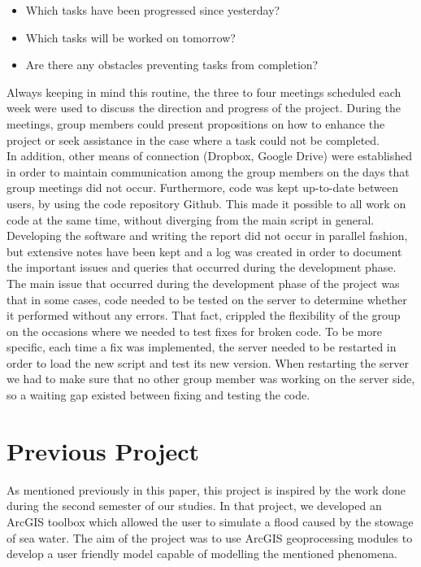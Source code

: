 \begin{itemize}
\item Which tasks have been progressed since yesterday?
\item Which tasks will be worked on tomorrow?
\item Are there any obstacles preventing tasks from completion?
\end{itemize}

Always keeping in mind this routine, the three to four meetings scheduled each week were used to discuss the direction and progress of the project. 
During the meetings, group members could present propositions on how to enhance the project or seek assistance in the case where a task could not be completed. \\
In addition, other means of connection (Dropbox, Google Drive) were established in order to maintain communication among the group members on the days that group meetings did not occur. Furthermore, code was kept up-to-date between users, by using the code repository Github. This made it possible to all work on code at the same time, without diverging from the main script in general. \\
Developing the software and writing the report did not occur in parallel fashion, but extensive notes have been kept and a log was created in order to document the important issues and queries that occurred during the development phase. \\

The main issue that occurred during the development phase of the project was that in some cases, code needed to be tested on the server to determine whether it performed without any errors. That fact, crippled the flexibility of the group on the occasions where we needed to test fixes for broken code. To be more specific, each time a fix was implemented, the server needed to be restarted in order to load the new script and test its new version. When restarting the server we had to make sure that no other group member was working on the server side, so a waiting gap existed between fixing and testing the code.\\

\section{Previous Project}
As mentioned previously in this paper, this project is inspired by the work done during the second semester of our studies. In that project, we developed an ArcGIS toolbox which allowed the user to simulate a flood caused by the stowage of sea water. The aim of the project was to use ArcGIS geoprocessing modules to develop a user friendly model capable of modelling the mentioned phenomena. \\

